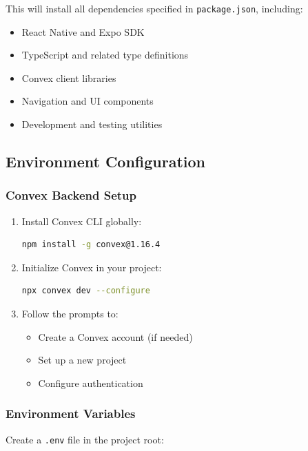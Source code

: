 \documentclass[a4paper,12pt]{article}
\begin{document}
This will install all dependencies specified in \texttt{package.json}, including:
\begin{itemize}
    \item React Native and Expo SDK
    \item TypeScript and related type definitions
    \item Convex client libraries
    \item Navigation and UI components
    \item Development and testing utilities
\end{itemize}

\subsection{Environment Configuration}

\subsubsection{Convex Backend Setup}

\begin{enumerate}
    \item Install Convex CLI globally:
    \begin{lstlisting}[language=bash]
npm install -g convex@1.16.4
    \end{lstlisting}
    
    \item Initialize Convex in your project:
    \begin{lstlisting}[language=bash]
npx convex dev --configure
    \end{lstlisting}
    
    \item Follow the prompts to:
    \begin{itemize}
        \item Create a Convex account (if needed)
        \item Set up a new project
        \item Configure authentication
    \end{itemize}
\end{enumerate}

\subsubsection{Environment Variables}

Create a \texttt{.env} file in the project root:
\end{document}
